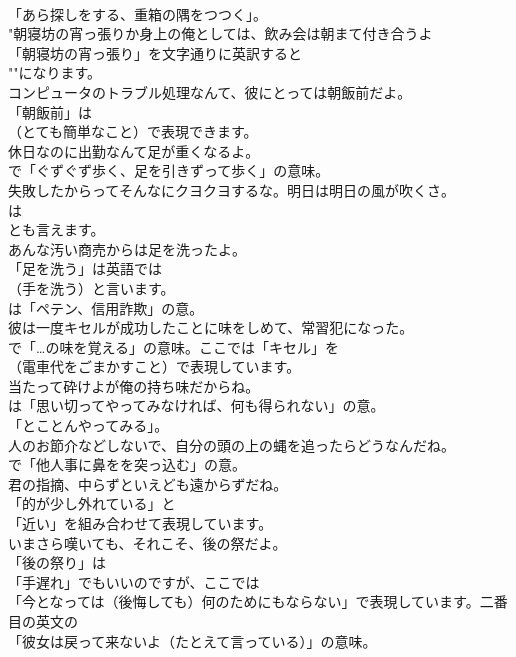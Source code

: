 \documentclass[8pt]{extreport}
\begin{document}
\begin{CJK}{UTF8}{min}
\\	「あら探しをする、重箱の隅をつつく」。	
\\	"朝寝坊の宵っ張りか身上の俺としては、飲み会は朝まて付き合うよ 
\\	「朝寝坊の宵っ張り」を文字通りに英訳すると
\\	""になります。
\\	コンピュータのトラブル処理なんて、彼にとっては朝飯前だよ。 
\\	「朝飯前」は 
\\	（とても簡単なこと）で表現できます。	
\\	休日なのに出勤なんて足が重くなるよ。 
\\	で「ぐずぐず歩く、足を引きずって歩く」の意味。	
\\	失敗したからってそんなにクヨクヨするな。明日は明日の風が吹くさ。 
\\	は 
\\	とも言えます。	
\\	あんな汚い商売からは足を洗ったよ。 
\\	「足を洗う」は英語では 
\\	（手を洗う）と言います。
\\	は「ペテン、信用詐欺」の意。	
\\	彼は一度キセルが成功したことに味をしめて、常習犯になった。 
\\	で「…の味を覚える」の意味。ここでは「キセル」を 
\\	（電車代をごまかすこと）で表現しています。	
\\	当たって砕けよが俺の持ち味だからね。 
\\	は「思い切ってやってみなければ、何も得られない」の意。
\\	「とことんやってみる」。	
\\	人のお節介などしないで、自分の頭の上の蝿を追ったらどうなんだね。 
\\	で「他人事に鼻をを突っ込む」の意。	
\\	君の指摘、中らずといえども遠からずだね。 
\\	「的が少し外れている」と
\\	「近い」を組み合わせて表現しています。	
\\	いまさら嘆いても、それこそ、後の祭だよ。 
\\	「後の祭り」は
\\	「手遅れ」でもいいのですが、ここでは
\\	「今となっては（後悔しても）何のためにもならない」で表現しています。二番目の英文の
\\	「彼女は戻って来ないよ（たとえて言っている）」の意味。	

\end{CJK}
\end{document}
